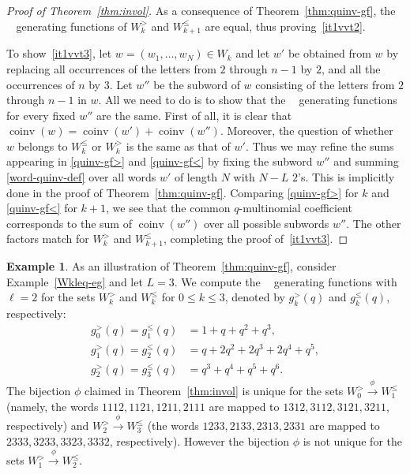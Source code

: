 \documentclass[11pt]{article}
\theoremstyle{definition}
\newtheorem{example}[theo]{Example}
\numberwithin{equation}{section}
\DeclareMathOperator{\coinv}{coinv}
\DeclareMathOperator{\quinvL}{\quinv^{(\ell)}}
\DeclareMathOperator{\quinv}{quinv}
\begin{document}
\begin{proof}[Proof of Theorem~\ref{thm:invol}]
As a consequence of Theorem~\ref{thm:quinv-gf}, the $\quinvL$ generating functions of $W_{k}^>$ and $W_{k+1}^\leq$ are equal, thus proving~\ref{it1vvt2}. 

To show~\ref{it1vvt3}, let $w = (w_1, \dots, w_N) \in W_k$ and let $w'$ be obtained from $w$ by replacing all
occurrences of the letters from $2$ through $n-1$ by $2$, and all the occurrences of $n$ by $3$.
Let $w''$ be the subword of $w$ consisting of the letters from $2$ through $n-1$ in $w$. 
All we need to do is to show that the $\quinvL$ generating functions for every fixed $w''$ are the same.
First of all, it is clear that $\coinv(w) = \coinv(w') + \coinv(w'')$.  Moreover, the question of whether $w$
belongs to $W_k^\leq$ or $W_k^>$ is the same as that of $w'$. 
Thus we may refine the sums appearing in \eqref{quinv-gf>} and \eqref{quinv-gf<} by fixing the subword $w''$ and summing \eqref{word-quinv-def} over all words $w'$ of length $N$ with $N-L$ $2$'s.
This is implicitly done in the proof of Theorem~\ref{thm:quinv-gf}. Comparing \eqref{quinv-gf>} for $k$ and \eqref{quinv-gf<} for $k+1$, we see that the common $q$-multinomial coefficient corresponds to the sum of $\coinv(w'')$ over all possible subwords $w''$. The other factors match for $W_k^>$ and $W_{k+1}^\leq$, completing the proof of~\ref{it1vvt3}.
\end{proof}


\begin{example}
\label{eg:W<>}
As an illustration of Theorem~\ref{thm:quinv-gf}, consider Example~\ref{Wkleq-eg} and let $L= 3$. We compute the $\quinvL$ generating functions with $\ell = 2$ for the sets $W_k^>$ and $W_k^\leq$ for $0\leq k\leq 3$, denoted by $g_k^>(q)$ and $g_k^\leq(q)$, respectively:
\begin{equation*}
\begin{split}
g_0^>(q)=g_1^\leq(q)&=1+q+q^2+q^3,\\
g_1^>(q)=g_2^\leq(q)&=q+2q^2+2q^3+2q^4+q^5,\\
g_2^>(q)=g_3^\leq(q)&=q^3+q^4+q^5+q^6.
\end{split}
\end{equation*}
The bijection $\phi$ claimed in Theorem~\ref{thm:invol} is unique for the sets $W_0^> \xrightarrow{\phi} W_1^\leq$ (namely, the words $1112,1121,1211,2111$ are mapped to $1312,3112,3121,3211$, respectively) and $W_2^> \xrightarrow{\phi} W_3^\leq$ (the words $1233,2133,2313,2331$ are mapped to\linebreak $2333,3233,3323,3332$, respectively). However the bijection $\phi$ is not unique for the sets $W_1^> \xrightarrow{\phi} W_2^\leq$.
\end{example}
\end{document}
